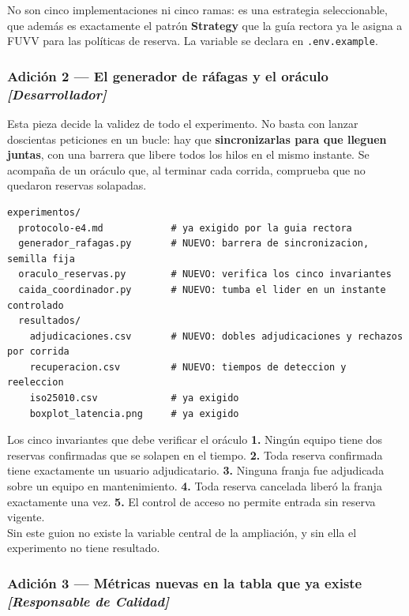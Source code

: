\documentclass[11pt,a4paper]{article}
\begin{document}
No son cinco implementaciones ni cinco ramas: es una estrategia seleccionable, que además es exactamente el patrón \textbf{Strategy} que la guía rectora ya le asigna a FUVV para las políticas de reserva. La variable se declara en \texttt{.env.example}.

\subsubsection{Adición 2 --- El generador de ráfagas y el oráculo \emph{[Desarrollador]}}

Esta pieza decide la validez de todo el experimento. No basta con lanzar doscientas peticiones en un bucle: hay que \textbf{sincronizarlas para que lleguen juntas}, con una barrera que libere todos los hilos en el mismo instante. Se acompaña de un oráculo que, al terminar cada corrida, comprueba que no quedaron reservas solapadas.

\begin{lstlisting}
experimentos/
  protocolo-e4.md            # ya exigido por la guia rectora
  generador_rafagas.py       # NUEVO: barrera de sincronizacion, semilla fija
  oraculo_reservas.py        # NUEVO: verifica los cinco invariantes
  caida_coordinador.py       # NUEVO: tumba el lider en un instante controlado
  resultados/
    adjudicaciones.csv       # NUEVO: dobles adjudicaciones y rechazos por corrida
    recuperacion.csv         # NUEVO: tiempos de deteccion y reeleccion
    iso25010.csv             # ya exigido
    boxplot_latencia.png     # ya exigido
\end{lstlisting}

\begin{defBox}{Los cinco invariantes que debe verificar el oráculo}
	\textbf{1.} Ningún equipo tiene dos reservas confirmadas que se solapen en el tiempo. \textbf{2.} Toda reserva confirmada tiene exactamente un usuario adjudicatario. \textbf{3.} Ninguna franja fue adjudicada sobre un equipo en mantenimiento. \textbf{4.} Toda reserva cancelada liberó la franja exactamente una vez. \textbf{5.} El control de acceso no permite entrada sin reserva vigente.\\[5pt]
	Sin este guion no existe la variable central de la ampliación, y sin ella el experimento no tiene resultado.
\end{defBox}

\subsubsection{Adición 3 --- Métricas nuevas en la tabla que ya existe \emph{[Responsable de Calidad]}}
\end{document}
